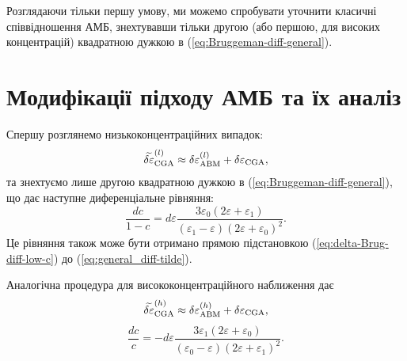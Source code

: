 \documentclass[14pt,twoside]{vakthesis}
\begin{document}
Розглядаючи тільки першу умову, ми можемо спробувати уточнити класичні співвідношення АМБ, знехтувавши тільки другою (або першою, для високих концентрацій) квадратною дужкою в (\ref{eq:Bruggeman-diff-general}).


\section{Модифікації підходу АМБ та їх аналіз}

Спершу розглянемо низькоконцентраційних випадок:
\begin{equation}\label{eq:delta-Brug-diff-low-c}
\widetilde{\delta\varepsilon}_{\rm CGA}^{(l)} \approx \delta\varepsilon_{\rm ABM}^{(l)} + \delta\varepsilon_{\rm CGA},
\end{equation}
та знехтуємо лише другою квадратною дужкою в (\ref{eq:Bruggeman-diff-general}), що дає наступне диференціальне рівняння:
\begin{equation}\label{eq:Bruggeman-diff-low-c}
\frac{d c}{1-c} = d\varepsilon \frac{3\varepsilon_0(2\varepsilon + \varepsilon_1)}{(\varepsilon_1 - \varepsilon) (2\varepsilon + \varepsilon_0)^2}.
\end{equation}
Це рівняння також може бути отримано прямою підстановкою (\ref{eq:delta-Brug-diff-low-c}) до (\ref{eq:general_diff-tilde}).

Аналогічна процедура для висококонцентраційного наближення дає
\begin{equation}\label{eq:delta-Brug-diff-high-c}
\widetilde{\delta\varepsilon}_{\rm CGA}^{(h)} \approx \delta\varepsilon_{\rm ABM}^{(h)} + \delta\varepsilon_{\rm CGA},
\end{equation}
\begin{equation}\label{eq:Bruggeman-diff-high-c}
\frac{d c}{c} = - d\varepsilon \frac{3\varepsilon_1 (2\varepsilon + \varepsilon_0)}{(\varepsilon_0 - \varepsilon) (2\varepsilon + \varepsilon_1)^2}.
\end{equation}
\end{document}
